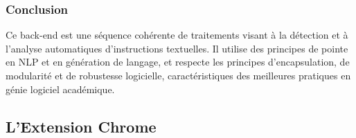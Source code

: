 \begin{description}
\begin{description}
\end{description}


\subsubsection*{Conclusion}
Ce back-end est une séquence cohérente de traitements visant à la détection et à l'analyse automatiques d'instructions textuelles. Il utilise des principes de pointe en NLP et en génération de langage, et respecte les principes d'encapsulation, de modularité et de robustesse logicielle, caractéristiques des meilleures pratiques en génie logiciel académique.
\end{description}


\subsection{L'Extension Chrome}

